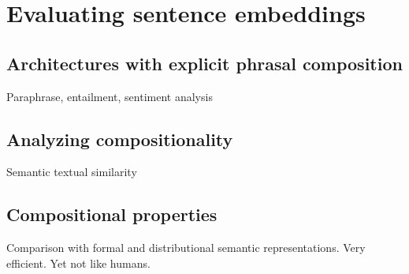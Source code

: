 \setchapterpreamble[u]{\margintoc}
\chapter{Evaluating sentence embeddings}



\section{Architectures with explicit phrasal composition}

Paraphrase, entailment, sentiment analysis

\section{Analyzing compositionality}

Semantic textual similarity

\section{Compositional properties}

Comparison with formal and distributional semantic representations. Very efficient. Yet not like humans.
